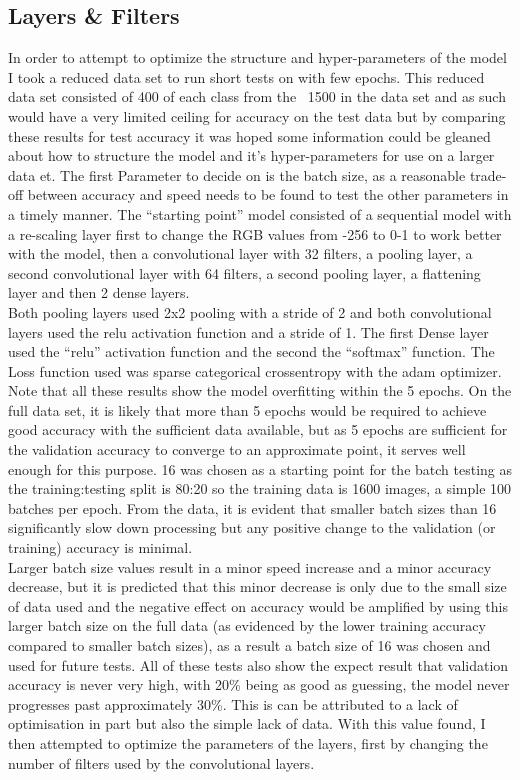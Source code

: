 \subsection{Layers \& Filters}

In order to attempt to optimize the structure and hyper-parameters of the model I took a reduced data set to run short tests on with few epochs. This reduced data set consisted of 400 of each class from the ~1500 in the data set and as such would have a very limited ceiling for accuracy on the test data but by comparing these results for test accuracy it was hoped some information could be gleaned about how to structure the model and it’s hyper-parameters for use on a larger data et. The first Parameter to decide on is the batch size, as a reasonable trade-off between accuracy and speed needs to be found to test the other parameters in a timely manner. The “starting point” model consisted of a sequential model with a re-scaling layer first to change the RGB values from -256 to 0-1 to work better with the model, then a convolutional layer with 32 filters, a pooling layer, a second convolutional layer with 64 filters, a second pooling layer, a flattening layer and then 2 dense layers. \\

Both pooling layers used 2x2 pooling with a stride of 2 and both convolutional layers used the relu activation function and a stride of 1. The first Dense layer used the “relu” activation function and the second the “softmax” function. The Loss function used was sparse categorical crossentropy with the adam optimizer. Note that all these results show the model overfitting within the 5 epochs. On the full data set, it is likely that more than 5 epochs would be required to achieve good accuracy with the sufficient data available, but as 5 epochs are sufficient for the validation accuracy to converge to an approximate point, it serves well enough for this purpose. 16 was chosen as a starting point for the batch testing as the training:testing split is 80:20 so the training data is 1600 images, a simple 100 batches per epoch. From the data, it is evident that smaller batch sizes than 16 significantly slow down processing but any positive change to the validation (or training) accuracy is minimal. \\

Larger batch size values result in a minor speed increase and a minor accuracy decrease, but it is predicted that this minor decrease is only due to the small size of data used and the negative effect on accuracy would be amplified by using this larger batch size on the full data (as evidenced by the lower training accuracy compared to smaller batch sizes), as a result a batch size of 16 was chosen and used for future tests. All of these tests also show the expect result that validation accuracy is never very high, with 20\% being as good as guessing, the model never progresses past approximately 30\%. This is can be attributed to a lack of optimisation in part but also the simple lack of data. With this value found, I then attempted to optimize the parameters of the layers, first by changing the number of filters used by the convolutional layers. \\


